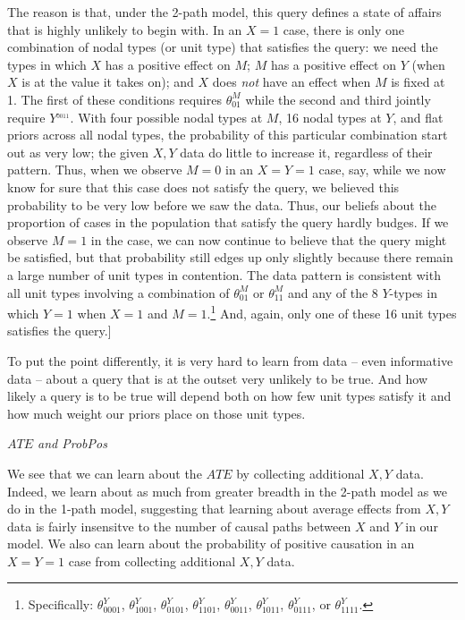 \documentclass[
  12pt,
]{book}
\begin{document}
The reason is that, under the 2-path model, this query defines a state of affairs that is highly unlikely to begin with. In an \(X=1\) case, there is only one combination of nodal types (or unit type) that satisfies the query: we need the types in which \(X\) has a positive effect on \(M\); \(M\) has a positive effect on \(Y\) (when \(X\) is at the value it takes on); and \(X\) does \emph{not} have an effect when \(M\) is fixed at 1. The first of these conditions requires \(\theta^M_{01}\) while the second and third jointly require \(Y^_{0011}\). With four possible nodal types at \(M\), 16 nodal types at \(Y\), and flat priors across all nodal types, the probability of this particular combination start out as very low; the given \(X, Y\) data do little to increase it, regardless of their pattern.
Thus, when we observe \(M=0\) in an \(X=Y=1\) case, say, while we now know for sure that this case does not satisfy the query, we believed this probability to be very low before we saw the data. Thus, our beliefs about the proportion of cases in the population that satisfy the query hardly budges. If we observe \(M=1\) in the case, we can now continue to believe that the query might be satisfied, but that probability still edges up only slightly because there remain a large number of unit types in contention. The data pattern is consistent with all unit types involving a combination of \(\theta^M_{01}\) or \(\theta^M_{11}\) and any of the 8 \(Y\)-types in which \(Y=1\) when \(X=1\) and \(M=1\).\footnote{Specifically: \(\theta^Y_{0001}\), \(\theta^Y_{1001}\), \(\theta^Y_{0101}\), \(\theta^Y_{1101}\), \(\theta^Y_{0011}\), \(\theta^Y_{1011}\), \(\theta^Y_{0111}\), or \(\theta^Y_{1111}\).} And, again, only one of these 16 unit types satisfies the query.{]}

To put the point differently, it is very hard to learn from data -- even informative data -- about a query that is at the outset very unlikely to be true. And how likely a query is to be true will depend both on how few unit types satisfy it and how much weight our priors place on those unit types.

\emph{\(ATE\) and ProbPos}

We see that we can learn about the \(ATE\) by collecting additional \(X, Y\) data. Indeed, we learn about as much from greater breadth in the 2-path model as we do in the 1-path model, suggesting that learning about average effects from \(X, Y\) data is fairly insensitve to the number of causal paths between \(X\) and \(Y\) in our model. We also can learn about the probability of positive causation in an \(X=Y=1\) case from collecting additional \(X,Y\) data.
\end{document}

